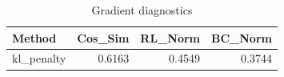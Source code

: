 \begin{table}[htbp]
\centering
\caption{Gradient diagnostics}
\label{tab:grad-diag}
\begin{tabular}{lrrr}
\toprule
\textbf{Method} & \textbf{Cos\_Sim} & \textbf{RL\_Norm} & \textbf{BC\_Norm} \\
\midrule
kl\_penalty & 0.6163 & 0.4549 & 0.3744 \\
\bottomrule
\end{tabular}
\end{table}